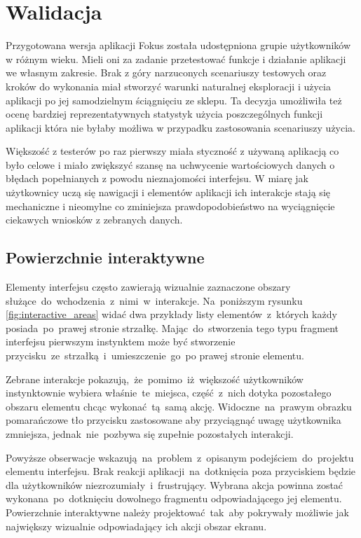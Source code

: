 \section{Walidacja}
Przygotowana wersja aplikacji Fokus została udostępniona grupie użytkowników w różnym wieku. Mieli oni za zadanie przetestować funkcje i działanie aplikacji we własnym zakresie. Brak z góry narzuconych scenariuszy testowych oraz kroków do wykonania miał stworzyć warunki naturalnej eksploracji i użycia aplikacji po jej samodzielnym ściągnięciu ze sklepu. Ta decyzja umożliwiła też ocenę bardziej reprezentatywnych statystyk użycia poszczególnych funkcji aplikacji która nie byłaby możliwa w przypadku zastosowania scenariuszy użycia. 

Większość z testerów po raz pierwszy miała styczność z używaną aplikacją co było celowe i miało zwiększyć szansę na uchwycenie wartościowych danych o błędach popełnianych z powodu nieznajomości interfejsu. W miarę jak użytkownicy uczą się nawigacji i elementów aplikacji ich interakcje stają się mechaniczne i nieomylne co zminiejsza prawdopodobieństwo na wyciągnięcie ciekawych wniosków z zebranych danych.

\subsection{Powierzchnie interaktywne}
Elementy interfejsu często zawierają wizualnie zaznaczone obszary służące~do~wchodzenia~z~nimi~w~interakcje. Na~poniższym rysunku \ref{fig:interactive_areas} widać dwa przykłady listy elementów~z~których każdy posiada~po~prawej stronie strzałkę. Mając~do~stworzenia tego typu fragment interfejsu pierwszym instynktem może być stworzenie przycisku~ze~strzałką~i~umieszczenie~go~po prawej stronie elementu.

Zebrane interakcje pokazują,~że~pomimo~iż~większość użytkowników instynktownie wybiera właśnie~te~miejsca, część~z~nich dotyka pozostałego obszaru elementu chcąc wykonać~tą~samą akcję. Widoczne~na~prawym obrazku pomarańczowe tło przycisku zastosowane aby przyciągnąć uwagę użytkownika zmniejsza, jednak~nie~pozbywa się zupełnie pozostałych interakcji. 

Powyższe obserwacje wskazują~na~problem~z~opisanym podejściem~do~projektu elementu interfejsu. Brak reakcji aplikacji~na~dotknięcia poza przyciskiem będzie dla użytkowników niezrozumiały~i~frustrujący. Wybrana akcja powinna zostać wykonana~po~dotknięciu dowolnego fragmentu odpowiadającego jej elementu. Powierzchnie interaktywne należy projektować~tak~aby pokrywały możliwie jak największy wizualnie odpowiadający ich akcji obszar ekranu.

